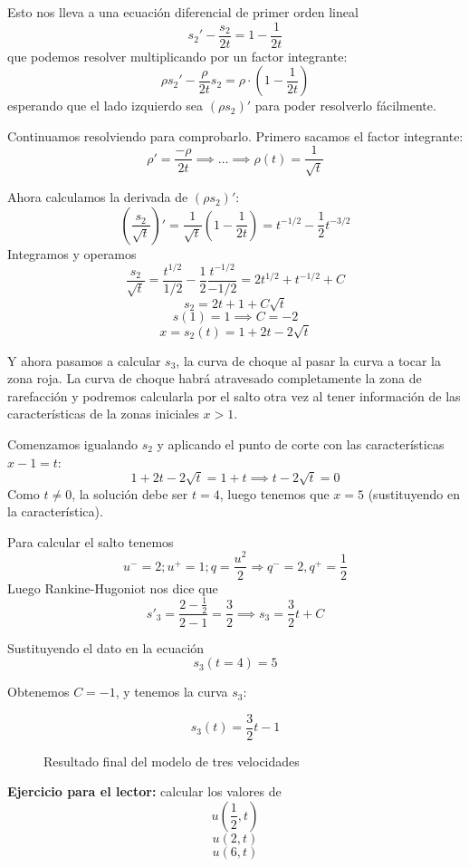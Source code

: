 \begin{example}
			Esto nos lleva a una ecuación diferencial de primer orden lineal \[ s_2' - \frac{s_2}{2t} = 1 - \frac{1}{2t} \] que podemos resolver multiplicando por un factor integrante: \[ \rho s_2' - \frac{\rho}{2t} s_2 = \rho · \left(1 - \frac{1}{2t}\right) \] esperando que el lado izquierdo sea $(ρs_2)'$ para poder resolverlo fácilmente.

			Continuamos resolviendo para comprobarlo. Primero sacamos el factor integrante: \[ \rho' = \frac{-\rho}{2t} \implies … \implies \rho(t) = \frac{1}{\sqrt{t}} \]

			Ahora calculamos la derivada de $(ρs_2)'$: \
			\[ \left(\frac{s_2}{\sqrt{t}}\right)' = \frac{1}{\sqrt{t}} \left( 1 - \frac{1}{2t}\right) = t^{-1/2} - \frac{1}{2} t^{-3/2} \]
			Integramos y operamos
			$$\frac{s_2}{\sqrt{t}} = \frac{t^{1/2}}{1/2} - \frac{1}{2} \frac{t^{-1/2}}{-1/2} = 2t^{1/2} + t^{-1/2} + C$$
			$$ s_2 = 2t + 1 + C \sqrt{t} $$
			$$ s(1) = 1 \implies C = -2 $$
			$$ x = s_2 (t) = 1 + 2t - 2 \sqrt{t} $$

			Y ahora pasamos a calcular $s_3$, la curva de choque al pasar la curva a tocar la zona roja. La curva de choque habrá atravesado completamente la zona de rarefacción y podremos calcularla por el salto otra vez al tener información de las características de la zonas iniciales $x>1$.


			Comenzamos igualando $s_2$ y aplicando el punto de corte con las características $x-1=t$:
			$$ 1+2t - 2 \sqrt{t} = 1 + t \implies t- 2 \sqrt{t} = 0$$
			Como $t\neq 0$, la solución debe ser $t=4$, luego tenemos que $x=5$ (sustituyendo en la característica).

			Para calcular el salto tenemos
			$$u^{-} = 2 ; u^{+} = 1; q = \frac{u^2}{2} \Rightarrow q^{-} = 2, q^{+} = \frac{1}{2}$$
			Luego Rankine-Hugoniot nos dice que
			$$s'_3 = \frac{2 - \frac{1}{2}}{2 - 1} = \frac{3}{2} \implies s_3 = \frac{3}{2} t + C$$

			Sustituyendo el dato en la ecuación
			$$s_3 (t = 4) = 5$$

			Obtenemos $C = -1$, y tenemos la curva $s_3$:

			$$s_3(t) = \frac{3}{2} t - 1$$


			\begin{figure}[hbtp]
				\centering
				\caption{Resultado final del modelo de tres velocidades}
				\label{fig:ModeloTresVelocidades}
			\end{figure}



			\textbf{Ejercicio para el lector:} calcular los valores de
			$$ u(\frac{1}{2},t) $$
			$$ u(2,t)$$
			$$ u(6,t)$$


		\end{example}

